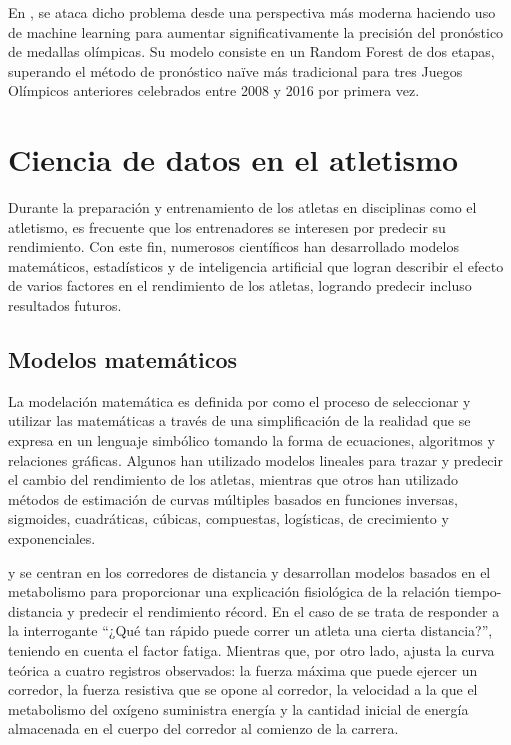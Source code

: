 En \cite{schlembach2020forecasting}, se ataca dicho problema desde una perspectiva más moderna haciendo uso de machine learning para aumentar significativamente la precisión del pronóstico de medallas olímpicas. Su modelo consiste en un Random Forest de dos etapas, superando el método de pronóstico naïve más tradicional para tres Juegos Olímpicos anteriores celebrados entre 2008 y 2016 por primera vez.

\section{Ciencia de datos en el atletismo}

Durante la preparación y entrenamiento de los atletas en disciplinas como el atletismo, es frecuente que los entrenadores se interesen por predecir su rendimiento. Con este fin, numerosos científicos han desarrollado modelos matemáticos, estadísticos y de inteligencia artificial que logran describir el efecto de varios factores en el rendimiento de los atletas, logrando predecir incluso resultados futuros. 

\subsection{Modelos matemáticos}

La modelación matemática es definida por \cite{anhalt2018mathematical} como el proceso de seleccionar y utilizar las matemáticas a través de una simplificación de la realidad que se expresa en un lenguaje simbólico tomando la forma de ecuaciones, algoritmos y relaciones gráficas. Algunos han utilizado modelos lineales para trazar y predecir el cambio del rendimiento de los atletas, mientras que otros han utilizado métodos de estimación de curvas múltiples basados en funciones inversas, sigmoides, cuadráticas, cúbicas, compuestas, logísticas, de crecimiento y exponenciales.

\cite{hill1925physiological} y \cite{keller1973theory} se centran en los corredores de distancia y desarrollan modelos basados en el metabolismo para proporcionar una explicación fisiológica de la relación tiempo-distancia y predecir el rendimiento récord. En el caso de \cite{hill1925physiological} se trata de responder a la interrogante “¿Qué tan rápido puede correr un atleta una cierta distancia?”, teniendo en cuenta el factor fatiga. Mientras que, por otro lado, \cite{keller1973theory} ajusta la curva teórica a cuatro registros observados: la fuerza máxima que puede ejercer un corredor, la fuerza resistiva que se opone al corredor, la velocidad a la que el metabolismo del oxígeno suministra energía y la cantidad inicial de energía almacenada en el cuerpo del corredor al comienzo de la carrera. 

